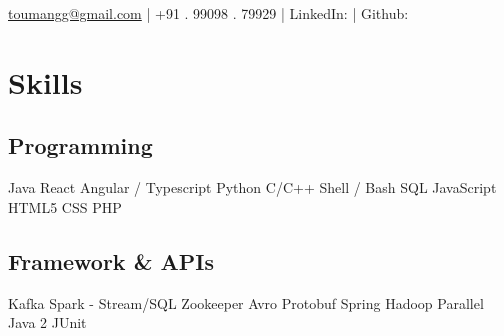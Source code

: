 \documentclass[]{main}
\begin{document}
\lastupdated

{\href{mailto:toumangg@gmail.com}{toumangg@gmail.com}  |  +91 . 99098 . 79929  | 
LinkedIn: \href{https://www.linkedin.com/in/galaumang}{} | Github: \href{https://github.com/galaumang}{}

}


\begin{minipage}[t]{0.25\textwidth} 



\section{Skills}
\subsection{Programming}\sectionsep
                    Java  
    \textbullet{}   React  
    \textbullet{}   Angular / Typescript
    \textbullet{}   Python  
    \textbullet{}   C/C++ 
    \textbullet{}   Shell / Bash  
    \textbullet{}   SQL
    \textbullet{}   JavaScript  
    \textbullet{}   HTML5  
    \textbullet{}   CSS  
    \textbullet{}   PHP
\sectionsep\sectionsep
\subsection{Framework \& APIs}\sectionsep
                    Kafka
    \textbullet{}   Spark - Stream/SQL  
    \textbullet{}   Zookeeper
    \textbullet{}   Avro    
    \textbullet{}   Protobuf 
    \textbullet{}   Spring 
    \textbullet{}   Hadoop  
    \textbullet{}   Parallel Java 2  
    \textbullet{}   JUnit
\sectionsep\sectionsep

\end{minipage}
\end{document}
